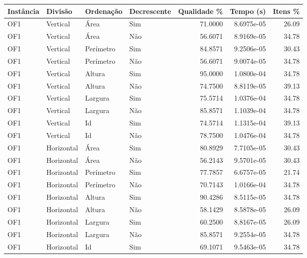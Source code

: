 \begin{tabular}{llllrrr}
\hline
Instância & Divisão     & Ordenação & Decrescente & Qualidade \% & Tempo (s)  & Itens \% \\
\hline
OF1       & Vertical    & Área      & Sim         & 71.0000      & 8.6975e-05 & 26.09    \\
OF1       & Vertical    & Área      & Não         & 56.6071      & 8.9169e-05 & 34.78    \\
OF1       & Vertical    & Perímetro & Sim         & 84.8571      & 9.2506e-05 & 30.43    \\
OF1       & Vertical    & Perímetro & Não         & 56.6071      & 9.0074e-05 & 34.78    \\
OF1       & Vertical    & Altura    & Sim         & 95.0000      & 1.0800e-04 & 34.78    \\
OF1       & Vertical    & Altura    & Não         & 74.7500      & 8.8119e-05 & 39.13    \\
OF1       & Vertical    & Largura   & Sim         & 75.5714      & 1.0376e-04 & 34.78    \\
OF1       & Vertical    & Largura   & Não         & 85.8571      & 1.1039e-04 & 34.78    \\
OF1       & Vertical    & Id        & Sim         & 74.5714      & 1.1315e-04 & 39.13    \\
OF1       & Vertical    & Id        & Não         & 78.7500      & 1.0476e-04 & 34.78    \\
OF1       & Horizontal  & Área      & Sim         & 80.8929      & 7.7105e-05 & 30.43    \\
OF1       & Horizontal  & Área      & Não         & 56.2143      & 9.5701e-05 & 30.43    \\
OF1       & Horizontal  & Perímetro & Sim         & 77.7857      & 6.6757e-05 & 21.74    \\
OF1       & Horizontal  & Perímetro & Não         & 70.7143      & 1.0166e-04 & 34.78    \\
OF1       & Horizontal  & Altura    & Sim         & 90.4286      & 8.5115e-05 & 34.78    \\
OF1       & Horizontal  & Altura    & Não         & 58.1429      & 8.5878e-05 & 26.09    \\
OF1       & Horizontal  & Largura   & Sim         & 60.2500      & 8.8167e-05 & 26.09    \\
OF1       & Horizontal  & Largura   & Não         & 85.8571      & 9.2554e-05 & 34.78    \\
OF1       & Horizontal  & Id        & Sim         & 69.1071      & 9.5463e-05 & 34.78    \\

\end{tabular}
